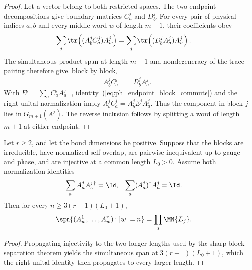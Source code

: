 \begin{proof}
    \leanok
    Let a vector belong to both restricted spaces. The two endpoint
    decompositions give boundary matrices $C_a^j$ and $D_b^j$. For every pair
    of physical indices $a,b$ and every middle word $w$ of length $m-1$, their
    coefficients obey
    \begin{align}
        \sum_j\tr\!\left((A_b^jC_a^j)A_w^j\right)
         & =
        \sum_j\tr\!\left((D_b^jA_a^j)A_w^j\right). \notag
    \end{align}
    The simultaneous product span at length $m-1$ and nondegeneracy of the
    trace pairing therefore give, block by block,
    \begin{align}
        A_b^jC_a^j & =D_b^jA_a^j.
        \label{eq:ph_endpoint_block_commute}
    \end{align}
    With $E^j=\sum_a C_a^jA_a^{j\,\dagger}$, identity~(\ref{eq:ph_endpoint_block_commute}) and the
    right-unital normalization imply
    $A_b^jC_a^j=A_b^jE^jA_a^j$.
    Thus the component in block $j$ lies in $G_{m+1}(A^j)$. The reverse
    inclusion follows by splitting a word of length $m+1$ at either endpoint.
\end{proof}

\begin{lemma}
    \label{thm:pgvwc_product_span_doubly_normalized}
    \leanok
    Let $r\ge2$, and let the bond dimensions be positive. Suppose that the
    blocks are irreducible, have normalized self-overlap, are pairwise
    inequivalent up to gauge and phase, and are injective at a common length
    $L_0>0$. Assume both normalization identities
    \begin{align}
        \sum_aA^j_aA^{j\,\dagger}_a & =\Id,
                                    & \sum_a(A^j_a)^\dagger A^j_a & =\Id. \notag
    \end{align}
    Then for every $n\ge3(r-1)(L_0+1)$,
    \begin{align}
        \spn\{(A^1_w,\ldots,A^r_w):|w|=n\} & =\prod_j\MN{D_j}. \notag
    \end{align}
\end{lemma}

\begin{proof}
    \leanok
    Propagating injectivity to the two longer lengths used by the sharp block
    separation theorem yields the simultaneous span at
    $3(r-1)(L_0+1)$, which the right-unital identity then propagates to every
    larger length.
\end{proof}

